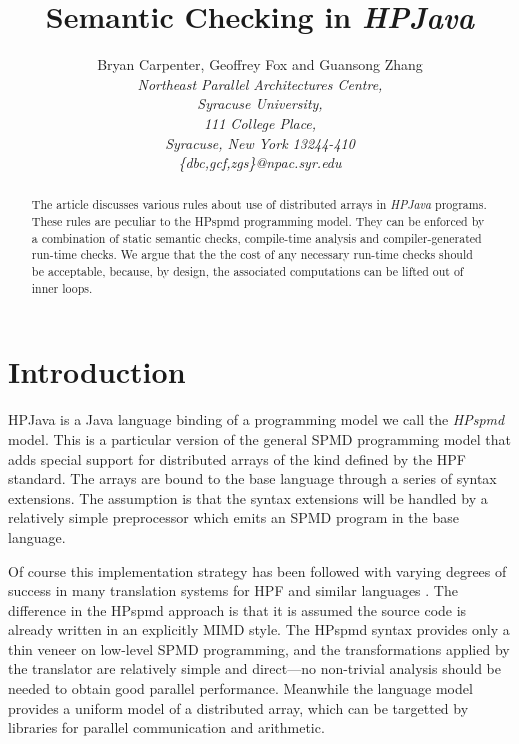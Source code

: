 \documentclass{article}
\begin{document}
\newtheorem{usageRule}{Rule}

\sloppy

\pagestyle{plain}

\title{Semantic Checking in {\em HPJava}}

\author{Bryan Carpenter, Geoffrey Fox and Guansong Zhang\vspace{0.2in} \\ 
        \em Northeast Parallel Architectures Centre, \\
        \em Syracuse University, \\
        \em 111 College Place, \\
        \em Syracuse, New York 13244-410 \\
        \em \{dbc,gcf,zgs\}@npac.syr.edu}

\maketitle

\begin{abstract}
The article discusses various rules about use of distributed arrays
in {\em HPJava} programs.  These rules are peculiar
to the HPspmd programming model.  They can be enforced by a
combination of static semantic checks, compile-time analysis and
compiler-generated run-time checks.  We argue that the the cost of any
necessary run-time checks should be acceptable, because, by design,
the associated computations can be lifted out of inner loops.
\end{abstract}

\section{Introduction}

HPJava \cite{HPJava} is a Java language binding of a programming model
we call the {\em HPspmd} model.  This is a particular version of the
general SPMD programming model that adds special support for
distributed arrays of the kind defined by the HPF standard.  The arrays
are bound to the base language through a series of syntax extensions.
The assumption is that the syntax extensions will be handled by a
relatively simple preprocessor which emits an SPMD program in the base
language.

Of course this implementation strategy has been followed with varying
degrees of success in many translation systems for HPF and similar
languages \cite{HPFStandard,HPFBook}.  The difference in the HPspmd
approach is that it is assumed the source code is already written in an
explicitly MIMD style.  The HPspmd syntax provides only a thin veneer
on low-level SPMD programming, and the transformations applied by the
translator are relatively simple and direct---no non-trivial analysis
should be needed to obtain good parallel performance.  Meanwhile
the language model provides a uniform model of a distributed
array, which can be targetted by libraries for parallel communication
and arithmetic.
\end{document}
